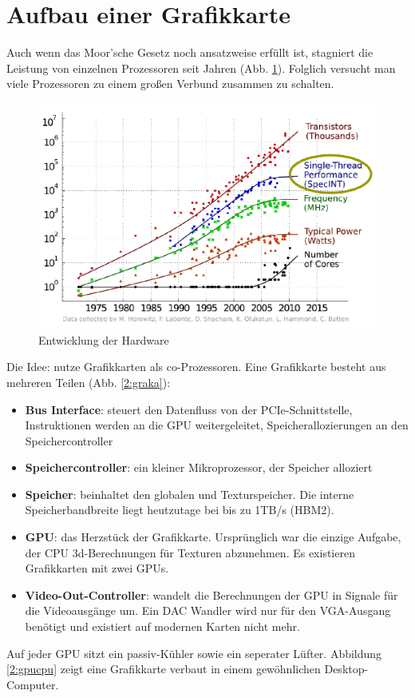         \section{Aufbau einer Grafikkarte}
        Auch wenn das Moor'sche Gesetz noch ansatzweise erfüllt ist, stagniert die Leistung von einzelnen Prozessoren seit Jahren (Abb. \ref{2:hard}). Folglich versucht man viele Prozessoren zu einem großen Verbund zusammen zu schalten.
        
        \begin{figure}[h]
			\centering
    		\includegraphics[height=0.6\textwidth]{chapter2/pictures/perf.png}
    		\caption[Hardware]{Entwicklung der Hardware}
    		\label{2:hard}
		\end{figure}

		Die Idee: nutze Grafikkarten als co-Prozessoren. Eine Grafikkarte besteht aus mehreren Teilen (Abb. \ref{2:graka}):
		\begin{itemize}
			\item \textbf{Bus Interface}: steuert den Datenfluss von der \Gls{PCIe}-Schnittstelle, Instruktionen werden an die GPU weitergeleitet, Speicherallozierungen an den Speichercontroller
			\item \textbf{Speichercontroller}: ein kleiner Mikroprozessor, der Speicher alloziert
			\item \textbf{Speicher}: beinhaltet den globalen und Texturspeicher. Die interne Speicherbandbreite liegt heutzutage bei bis zu 1TB/s (HBM2).
			\item \textbf{GPU}: das Herzstück der Grafikkarte. Ursprünglich war die einzige Aufgabe, der CPU 3d-Berechnungen für Texturen abzunehmen. Es existieren Grafikkarten mit zwei GPUs.
			\item \textbf{Video-Out-Controller}: wandelt die Berechnungen der GPU in Signale für die Videoausgänge um. Ein DAC Wandler wird nur für den VGA-Ausgang benötigt und existiert auf modernen Karten nicht mehr. 			
		\end{itemize}
		Auf jeder GPU sitzt ein passiv-Kühler sowie ein seperater Lüfter. Abbildung \ref{2:gpucpu} zeigt eine Grafikkarte verbaut in einem gewöhnlichen Desktop-Computer. 
		

